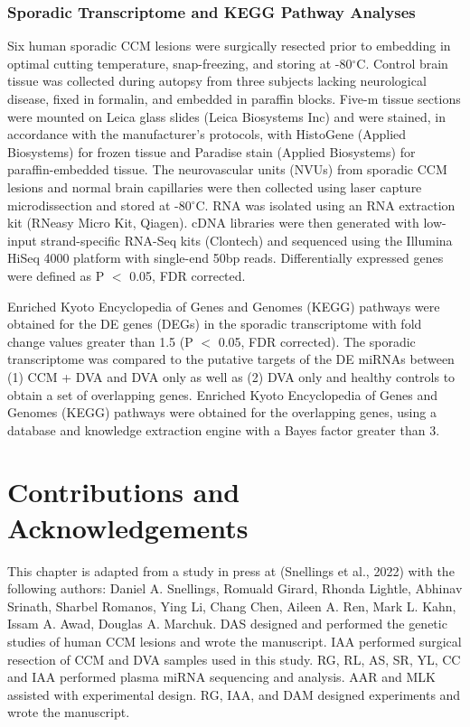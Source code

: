 \subsubsection{Sporadic Transcriptome and KEGG Pathway Analyses}

Six human sporadic CCM lesions were surgically resected prior to embedding in optimal cutting temperature, snap-freezing, and storing at -80$^{\circ}$C. Control brain tissue was collected during autopsy from three subjects lacking neurological disease, fixed in formalin, and embedded in paraffin blocks. Five-\textmu m tissue sections were mounted on Leica glass slides (Leica Biosystems Inc) and were stained, in accordance with the manufacturer’s protocols, with HistoGene (Applied Biosystems) for frozen tissue and Paradise stain (Applied Biosystems) for paraffin-embedded tissue. The neurovascular units (NVUs) from sporadic CCM lesions and normal brain capillaries were then collected using laser capture microdissection and stored at -80$^{\circ}$C. RNA was isolated using an RNA extraction kit (RNeasy Micro Kit, Qiagen). cDNA libraries were then generated with low-input strand-specific RNA-Seq kits (Clontech) and sequenced using the Illumina HiSeq 4000 platform with single-end 50bp reads. Differentially expressed genes were defined as P $<$ 0.05, FDR corrected. 

Enriched Kyoto Encyclopedia of Genes and Genomes (KEGG) pathways\citep{kanehisa2021, kanehisa2000} were obtained for the DE genes (DEGs) in the sporadic transcriptome with fold change values greater than 1.5 (P $<$ 0.05, FDR corrected). The sporadic transcriptome was compared to the putative targets of the DE miRNAs between (1) CCM + DVA and DVA only as well as (2) DVA only and healthy controls to obtain a set of overlapping genes. Enriched Kyoto Encyclopedia of Genes and Genomes (KEGG) pathways were obtained for the overlapping genes, using a database and knowledge extraction engine with a Bayes factor greater than 3. 

\section{Contributions and Acknowledgements}
This chapter is adapted from a study in press at  (Snellings et al., 2022) with the following authors: Daniel A. Snellings, Romuald Girard, Rhonda Lightle, Abhinav Srinath, Sharbel Romanos, Ying Li, Chang Chen, Aileen A. Ren, Mark L. Kahn, Issam A. Awad, Douglas A. Marchuk. DAS designed and performed the genetic studies of human CCM lesions and wrote the manuscript. IAA performed surgical resection of CCM and DVA samples used in this study. RG, RL, AS, SR, YL, CC and IAA performed plasma miRNA sequencing and analysis. AAR and MLK assisted with experimental design. RG, IAA, and DAM designed experiments and wrote the manuscript.

